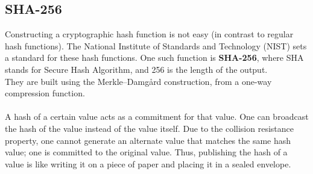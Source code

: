 \documentclass{report}
\begin{document}
\subsection*	{SHA-256}
Constructing a cryptographic hash function is not easy (in contrast to regular hash functions). The National Institute of Standards and Technology (NIST) sets a standard for these hash functions. One such function is \textbf{SHA-256}, where SHA stands for Secure Hash Algorithm, and 256 is the length of the output. \\
They are built using the Merkle–Damgård construction, from a one-way compression function.\\\\
A hash of a certain value acts as a commitment for that value.  One can broadcast the hash of the value instead of the value itself. Due to the collision resistance property, one cannot generate an alternate value that matches the same hash
value; one is committed to the original value. Thus, publishing the hash of a value is like writing it on a piece of paper and placing it in a sealed envelope.
\end{document}
